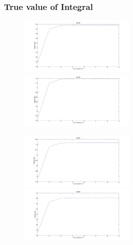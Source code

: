 \documentclass{beamer}
\begin{document}
\begin{frame}
\frametitle{True value of Integral}
   \begin{figure}[thpb]
      \centering
      \includegraphics[width=0.5\textwidth]{3dGH_for_exp.jpg}
      \includegraphics[width=0.5\textwidth]{4dGH_for_exp.jpg}
      \label{fig:23d4m1}
   \end{figure} 

   \begin{figure}[thpb]
      \centering
      \includegraphics[width=0.5\textwidth]{5dGH_for_exp.jpg}
      \includegraphics[width=0.5\textwidth]{6dGH_for_exp.jpg}
   \end{figure} 
\end{frame}
\end{document}
